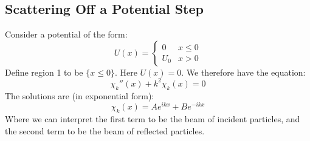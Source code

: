 \documentclass[../Main.tex]{subfiles}
\begin{document}
\subsection{Scattering Off a Potential Step}
Consider a potential of the form:
\begin{equation*}
    U(x) =
    \begin{cases}
        0 & x \leq 0 \\
        U_0 & x > 0
    \end{cases}
\end{equation*}
Define region 1 to be $\{x \leq 0\}$. Here $U(x) = 0$. We therefore have the equation:
\begin{equation*}
    \chi_k''(x) + k^2 \chi_k(x) = 0
\end{equation*}
The solutions are (in exponential form):
\begin{equation*}
    \chi_k(x) = Ae^{ikx} + Be^{-ikx}
\end{equation*}
Where we can interpret the first term to be the beam of incident particles, and the second term to be the beam of reflected particles.
\end{document}
